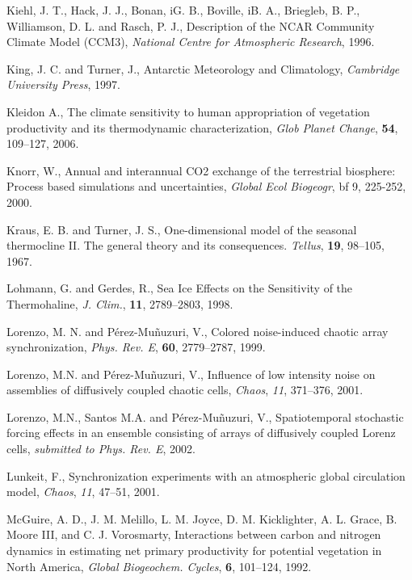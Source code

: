\begin{thebibliography}{}
 Kiehl, J. T., Hack, J. J., Bonan, iG. B., Boville, iB. A., Briegleb, B. P.,
 Williamson, D. L. and Rasch, P. J.,
 Description of the NCAR Community Climate Model (CCM3),
 {\em National Centre for Atmospheric Research}, 1996.

 King, J. C. and Turner, J.,
 Antarctic Meteorology and Climatology,
 {\em Cambridge University Press}, 1997.

 Kleidon A., The climate sensitivity to human appropriation of vegetation
 productivity and its thermodynamic characterization,
 {\it Glob Planet Change}, {\bf 54}, 109--127, 2006.

 Knorr, W., Annual and interannual CO2 exchange of the terrestrial
 biosphere: Process based simulations and uncertainties,
 {\it Global Ecol Biogeogr}, {bf 9}, 225-252, 2000.

 Kraus, E. B. and Turner, J. S.,
 One-dimensional model of the seasonal thermocline II.
 The general theory and its consequences.
 {\em Tellus}, {\bf 19}, 98--105, 1967.

 Lohmann, G. and Gerdes, R.,
 Sea Ice Effects on the Sensitivity of the Thermohaline,
 {\em J. Clim.}, {\bf 11}, 2789--2803, 1998.

 Lorenzo, M. N. and P\'{e}rez-Mu\~nuzuri, V.,
 Colored noise-induced chaotic array synchronization,
 {\em Phys. Rev. E}, {\bf 60}, 2779--2787, 1999.

 Lorenzo, M.N. and P\'{e}rez-Mu\~nuzuri, V.,  Influence of low
 intensity noise on assemblies of diffusively coupled chaotic
 cells, {\em Chaos}, {\em 11}, 371--376, 2001.

 Lorenzo, M.N., Santos M.A. and P\'{e}rez-Mu\~nuzuri, V.,
 Spatiotemporal stochastic forcing effects in an ensemble
 consisting of arrays of diffusively coupled Lorenz cells, {\em
 submitted to Phys. Rev. E}, 2002.

 Lunkeit, F., Synchronization experiments with an atmospheric
 global circulation model, {\em Chaos}, {\em 11}, 47--51, 2001.

 McGuire, A. D., J. M. Melillo, L. M. Joyce, D. M. Kicklighter,
 A. L. Grace, B. Moore III, and C. J. Vorosmarty, Interactions
 between carbon and nitrogen dynamics in estimating net primary
 productivity for potential vegetation in North America,
 {\it Global Biogeochem. Cycles}, {\bf 6}, 101--124, 1992.


\end{thebibliography}
